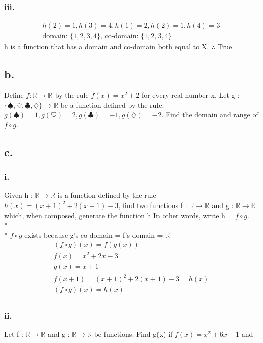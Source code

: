 \documentclass[a4paper, 12pt]{article}
\begin{document}
\subsubsection*{iii.}
\begin{align*}
    h(2) = 1, h(3) = 4, h(1) = 2, h(2)=1, h(4) = 3 \\
    \text{domain: } \{1,2,3,4\}\text{,} 
    \text{ co-domain: } \{1,2,3,4\} 
\end{align*}
h is a function that has a domain and co-domain both equal to X.
$\therefore$ True 

\subsection*{b.}
Define $f : \mathbb{R} \rightarrow \mathbb{R}$ by the rule $f(x) = x^2 + 2$ for every real number x. Let g : $\{\spadesuit, \heartsuit, \clubsuit, \diamondsuit\} \rightarrow  \mathbb{R}$
be a function defined by the rule: $g(\spadesuit) = 1, g(\heartsuit) = 2, g(\clubsuit) = -1, g(\diamondsuit) = -2$. Find the domain and range of $f \circ g$.

\subsection*{c.}
\subsubsection*{i.}
Given h : $\mathbb{R} \rightarrow \mathbb{R}$ is a function defined by the rule $h(x) = (x + 1)^2 + 2(x + 1) - 3$, find
two functions f : $\mathbb{R} \rightarrow \mathbb{R}$ and g : $\mathbb{R} \rightarrow \mathbb{R}$ which, when composed, generate the function h
In other words, write h = $f \circ g$.
\\*
\\*
$f \circ g$ exists because g's co-domain = f's domain = $\mathbb{R}$
\begin{align*}
    (f \circ g)(x) = f(g(x)) \\
    f(x) = x^2 + 2x - 3 \\
    g(x) = x + 1 \\
    f(x+1) = (x+1)^2 +2(x+1) - 3 = h(x) \\
    (f \circ g)(x) = h(x) \\ 
\end{align*}

\subsubsection*{ii.}
Let f : $\mathbb{R} \rightarrow \mathbb{R}$ and g : $\mathbb{R} \rightarrow \mathbb{R}$ be functions. Find g(x) if $f(x) = x^2 + 6x - 1$ and
\end{document}
